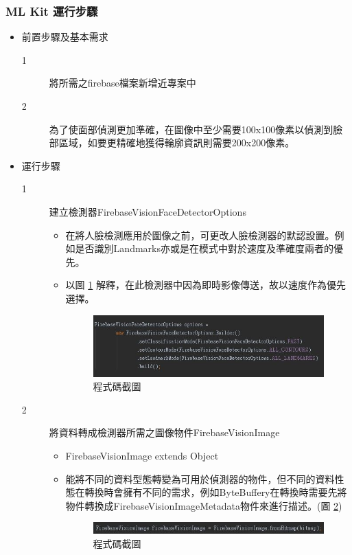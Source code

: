 \documentclass[12pt]{article}  %
\theoremstyle{plain}
\begin{document}
\subsubsection{ML Kit 運行步驟}
\begin{itemize}
\item 前置步驟及基本需求
\begin{description}
\item[1] 將所需之firebase檔案新增近專案中
\item[2] 為了使面部偵測更加準確，在圖像中至少需要100x100像素以偵測到臉部區域，如要更精確地獲得輪廓資訊則需要200x200像素。
\end{description}

\item 運行步驟
\begin{description}
\item[1] 建立檢測器FirebaseVisionFaceDetectorOptions
\begin{itemize}
\item 在將人臉檢測應用於圖像之前，可更改人臉檢測器的默認設置。例如是否識別Landmarks亦或是在模式中對於速度及準確度兩者的優先。
\item 以圖 \ref{DetectorOptions} 解釋，在此檢測器中因為即時影像傳送，故以速度作為優先選擇。
\begin{figure}[htbp]
\centering
\includegraphics[width=13cm]{pic/ch3/DetectorOptions.JPG}
\caption{程式碼截圖} \label{DetectorOptions}
\end{figure}
\end{itemize}

\item[2] 將資料轉成檢測器所需之圖像物件FirebaseVisionImage
\begin{itemize}
\item FirebaseVisionImage extends Object
\item 能將不同的資料型態轉變為可用於偵測器的物件，但不同的資料性態在轉換時會擁有不同的需求，例如ByteBuffery在轉換時需要先將物件轉換成FirebaseVisionImageMetadata物件來進行描述。(圖 \ref{VisionImage})
\begin{figure}[htbp]
\centering
\includegraphics[width=15cm]{pic/ch3/VisionImage.JPG}
\caption{程式碼截圖} \label{VisionImage}
\end{figure}
\end{itemize}


\end{description}
\end{itemize}
\end{document}
